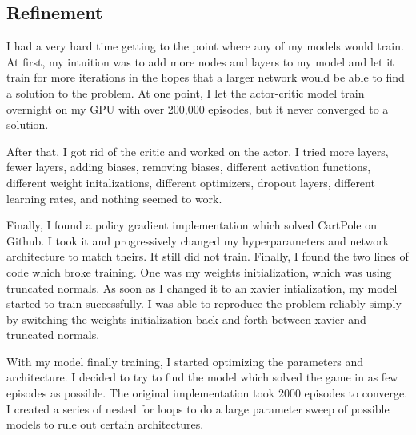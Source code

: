 \documentclass[12pt,a4paper]{article}
\begin{document}
\subsection*{Refinement}

I had a very hard time getting to the point where any of my models would train. At first, my intuition was to add more nodes and layers to my model and let it train for more iterations in the hopes that a larger network would be able to find a solution to the problem. At one point, I let the actor-critic model train overnight on my GPU with over 200,000 episodes, but it never converged to a solution.

After that, I got rid of the critic and worked on the actor. I tried more layers, fewer layers, adding biases, removing biases, different activation functions, different weight initalizations, different optimizers, dropout layers, different learning rates, and nothing seemed to work.

Finally, I found a policy gradient implementation which solved CartPole on Github. I took it and progressively changed my hyperparameters and network architecture to match theirs. It still did not train. Finally, I found the two lines of code which broke training. One was my weights initialization, which was using truncated normals. As soon as I changed it to an xavier intialization, my model started to train successfully. I was able to reproduce the problem reliably simply by switching the weights initialization back and forth between xavier and truncated normals.

With my model finally training, I started optimizing the parameters and architecture. I decided to try to find the model which solved the game in as few episodes as possible. The original implementation took 2000 episodes to converge. I created a series of nested for loops to do a large parameter sweep of possible models to rule out certain architectures. 
\end{document}
